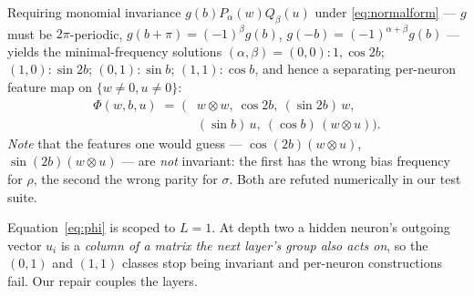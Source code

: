 \documentclass[10pt,twocolumn,letterpaper]{article}
\theoremstyle{definition}
\begin{document}
Requiring monomial invariance $g(b)P_\alpha(w)Q_\beta(u)$ under \eqref{eq:normalform} --- $g$
must be $2\pi$-periodic, $g(b+\pi) = (-1)^\beta g(b)$, $g(-b)=(-1)^{\alpha+\beta}g(b)$ --- yields
the minimal-frequency solutions $(\alpha,\beta) = (0,0) : 1, \cos 2b$; $(1,0): \sin 2b$;
$(0,1): \sin b$; $(1,1): \cos b$, and hence a separating per-neuron feature map on
$\{w\neq0,u\neq0\}$:
\begin{equation}
\begin{aligned}
\Phi(w,b,u) \;=\; \Big( &w\otimes w,\ \cos 2b,\ (\sin 2b)\,w,\\
&(\sin b)\,u,\ (\cos b)\,(w\otimes u)\Big).
\end{aligned}
\label{eq:phi}
\end{equation}
\emph{Note} that the features one would guess --- $\cos(2b)(w\otimes u)$, $\sin(2b)(w\otimes u)$
--- are \emph{not} invariant: the first has the wrong bias frequency for $\rho$, the second the
wrong parity for $\sigma$. Both are refuted numerically in our test suite.

Equation~\eqref{eq:phi} is scoped to $L=1$. At depth two a hidden neuron's outgoing vector $u_i$
is a \emph{column of a matrix the next layer's group also acts on}, so the $(0,1)$ and $(1,1)$
classes stop being invariant and per-neuron constructions fail. Our repair couples the layers.
\end{document}
